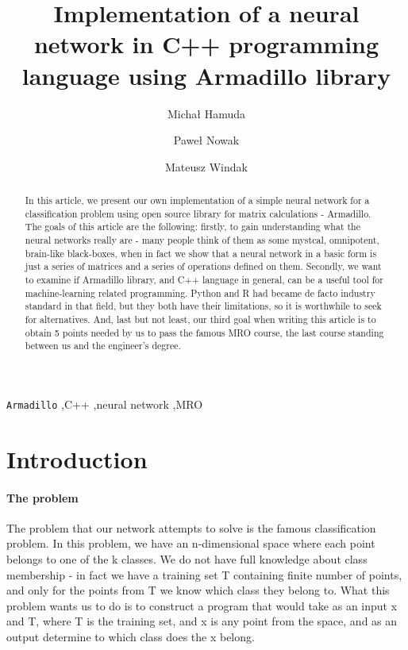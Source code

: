 \documentclass[3p,twocolumn]{elsarticle}
\begin{document}
\begin{frontmatter}

\title{Implementation of a neural network in C++ programming language using Armadillo library}

\author{Michał Hamuda}


\author{Paweł Nowak}

\author{Mateusz Windak}



\begin{abstract}
In this article, we present our own implementation of a simple neural network for a classification problem using open source library for matrix calculations - Armadillo. The goals of this article are the following: firstly, to gain understanding what the neural networks really are - many people think of them as some mystcal, omnipotent, brain-like black-boxes, when in fact we show that a neural network in a basic form is just a series of matrices and a series of operations defined on them. Secondly, we want to examine if Armadillo library, and C++ language in general, can be a useful tool for machine-learning related programming. Python and R had became de facto industry standard in that field, but they both have their limitations, so it is worthwhile to seek for alternatives. And, last but not least, our third goal when writing this article is to obtain 5 points needed by us to pass the famous MRO course, the last course standing between us and the engineer's degree.
\end{abstract}

\begin{keyword}
\texttt{Armadillo} \sep C++ \sep neural network \sep MRO
\end{keyword}

\end{frontmatter}


\section{Introduction}

\paragraph{The problem} 
The problem that our network attempts to solve is the famous classification problem. In this problem, we have an n-dimensional space where each point belongs to one of the k classes. We do not have full knowledge about class membership - in fact we have a training set T containing finite number of points, and only for the points from T we know which class they belong to. What this problem wants us to do is to construct a program that would take as an input x and T, where T is the training set, and x is any point from the space, and as an output determine to which class does the x belong.
\end{document}
